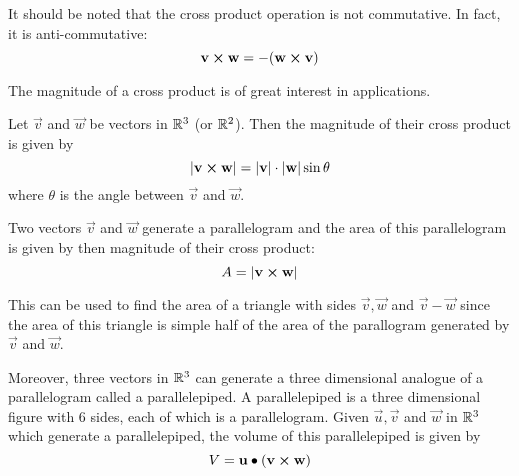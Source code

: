 \documentclass[handout]{ximera}
\begin{document}
It should be noted that the cross product operation is not commutative.  In fact, it is anti-commutative:
\[
\mathbf{v} \boldsymbol\times \mathbf{w} = -(\mathbf{w} \boldsymbol\times \mathbf{v})
\]

The magnitude of a cross product is of great interest in applications.
\begin{proposition}
Let $\vec{v}$ and $\vec{w}$ be vectors in $\mathbb R^3$ (or $\mathbb R^2$). Then the magnitude of their cross product is given by
\[
|\mathbf{v} \boldsymbol\times \mathbf{w}| = |\mathbf{v}| \cdot |\mathbf{w}| \sin \theta
\]
where $\theta$ is the angle between $\vec{v}$ and $\vec{w}$.
\end{proposition}

Two vectors $\vec{v}$ and $\vec{w}$ generate a parallelogram and the area of this parallelogram is given by then magnitude of their cross product:
\[
A = |\mathbf{v} \boldsymbol\times \mathbf{w}|
\]

\begin{image}
\end{image}

This can be used to find the area of a triangle with sides $\vec{v}, \vec{w}$ and $\vec{v}-\vec{w}$ since the area of this 
triangle is simple half of the area of the parallogram generated by $\vec{v}$ and $\vec{w}$.

\begin{image}
\end{image}


Moreover, three vectors in $\mathbb R^3$ can generate a three dimensional analogue of a parallelogram called a parallelepiped. 
A parallelepiped is a three dimensional figure with 6 sides, each of which is a parallelogram.
Given $\vec{u}, \vec{v}$ and $\vec{w}$
in $\mathbb R^3$ which generate a parallelepiped, the volume of this parallelepiped is given by
\[
V = \mathbf{u} \bullet \left(\mathbf{v} \boldsymbol\times \mathbf{w}\right)
\]
\end{document}

